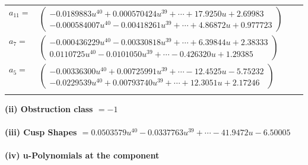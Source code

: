 \documentclass[1p]{elsarticle_modified}
\theoremstyle{definition}
\begin{document}
\begin{tabular}{m{7pt} m{180pt} m{7pt} m{180pt} }
\flushright $a_{11}=$&$\begin{pmatrix}-0.0189883 u^{40}+0.000570424 u^{39}+\cdots+17.9250 u+2.69983\\-0.000584007 u^{40}-0.00418261 u^{39}+\cdots+4.86872 u+0.977723\end{pmatrix}$ \\
\flushright $a_{7}=$&$\begin{pmatrix}-0.000436229 u^{40}-0.00330818 u^{39}+\cdots+6.39844 u+2.38333\\0.0110725 u^{40}-0.0101050 u^{39}+\cdots-0.426320 u+1.29385\end{pmatrix}$ \\
\flushright $a_{5}=$&$\begin{pmatrix}-0.00336300 u^{40}+0.00725991 u^{39}+\cdots-12.4525 u-5.75232\\-0.0229539 u^{40}+0.00793740 u^{39}+\cdots+12.3051 u+2.17246\end{pmatrix}$\\&\end{tabular}
\flushleft \textbf{(ii) Obstruction class $= -1$}\\~\\
\flushleft \textbf{(iii) Cusp Shapes $= 0.0503579 u^{40}-0.0337763 u^{39}+\cdots-41.9472 u-6.50005$}\\~\\
\newpage\renewcommand{\arraystretch}{1}
\flushleft \textbf{(iv) u-Polynomials at the component}\newline \\
\end{document}
